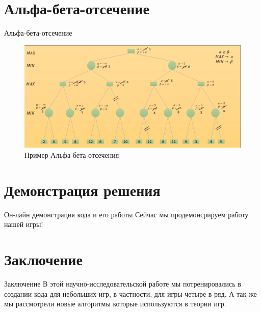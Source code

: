 \documentclass[handout]{beamer}
\begin{document}
	\section{Альфа-бета-отсечение}
    \begin{frame}{Альфа-бета-отсечение}
    	\begin{figure}
    		\includegraphics[width=0.9\linewidth]{unknown.png}
    		\caption{Пример Альфа-бета-отсечения}
    	\end{figure}
    \end{frame}
	
	\section{Демонстрация решения}
	\begin{frame}{Он-лайн демонстрация кода и его работы}
		Сейчас мы продемонсрируем работу нашей игры!\centering		
	\end{frame}
	
	
	\section{Заключение}
	\begin{frame}{Заключение}
		 В этой научно-исследовательской работе мы потренировались в создании кода для небольших игр, в частности, для игры четыре в ряд. А так же мы рассмотрели новые алгоритмы которые используются в теории игр.
		
	\end{frame}
	
\end{document}
